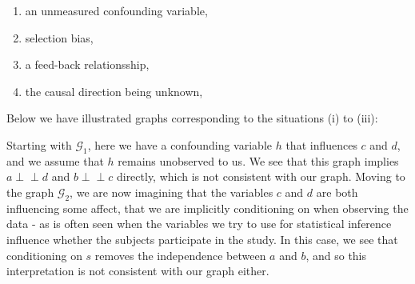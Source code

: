 \documentclass[11pt, a4paper]{memoir}
\theoremstyle{break}
\theoremstyle{break}
\theoremstyle{nonumberplain}
\newcommand{\indep}{\perp \!\!\! \perp}
\begin{document}
\begin{enumerate}[label=(\roman*)]
	\item an unmeasured confounding variable,
	\item selection bias,
	\item a feed-back relationsship,
	\item the causal direction being unknown,
\end{enumerate}
Below we have illustrated graphs corresponding to the situations (i) to (iii):
\begin{center}
\end{center}
Starting with $\mathcal{G}_1$, here we have a confounding variable $h$ that influences $c$ and $d$, and we assume that $h$ remains unobserved to us. We see that this graph implies $a\indep d$ and $b\indep c$ directly, which is not consistent with our graph. Moving to the graph $\mathcal{G}_2$, we are now imagining that the variables $c$ and $d$ are both influencing some affect, that we are implicitly conditioning on when observing the data - as is often seen when the variables we try to use for statistical inference influence whether the subjects participate in the study. In this case, we see that conditioning on $s$ removes the independence between $a$ and $b$, and so this interpretation is not consistent with our graph either.\\\\
\end{document}
